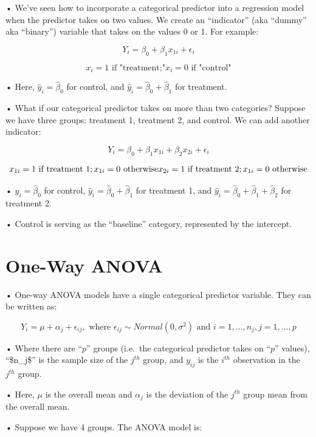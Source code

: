 \documentclass[
  letterpaper,
  DIV=11,
  numbers=noendperiod]{scrreprt}
\begin{document}
• We've seen how to incorporate a categorical predictor into a
regression model when the predictor takes on two values. We create an
``indicator'' (aka ``dummy'' aka ``binary'') variable that takes on the
values 0 or 1. For example:

\[
Y_i=\beta_0+\beta_1x_{1i} + \epsilon_i
\]

\[
x_i = 1 \text{ if "treatment;"} x_i = 0 \text{ if "control"}
\]

• Here, \(\hat{y}_i = \hat{\beta}_0\) for control, and
\(\hat{y}_i = \hat{\beta}_0 + \hat{\beta}_1\) for treatment.

• What if our categorical predictor takes on more than two categories?
Suppose we have three groups: treatment 1, treatment 2, and control. We
can add another indicator:

\[
Y_i=\beta_0+\beta_1x_{1i} + \beta_2x_{2i} + \epsilon_i
\]

\[
x_{1i} = 1 \text{ if treatment }1; x_{1i} = 0 \text{ otherwise} \\
x_{2i} = 1 \text{ if treatment }2; x_{1i} = 0 \text{ otherwise} 
\]

• \(\hat{y}_i = \hat{\beta}_0\) for control,
\(\hat{y}_i = \hat{\beta}_0 + \hat{\beta}_1\) for treatment 1, and
\(\hat{y}_i = \hat{\beta}_0 + \hat{\beta}_1 + \hat{\beta}_2\) for
treatment 2.

• Control is serving as the ``baseline'' category, represented by the
intercept.

\hypertarget{one-way-anova}{%
\section{One-Way ANOVA}\label{one-way-anova}}

• One-way ANOVA models have a single categorical predictor variable.
They can be written as:

\[
Y_i = \mu + \alpha_j + \epsilon_{ij}, \text{ where } \epsilon_{ij} \sim Normal(0,\sigma^2) \text{ and } i = 1, \dots ,n_j, j = 1, \dots, p
\]

• Where there are ``\(p\)'' groups (i.e.~the categorical predictor takes
on ``\(p\)'' values), ``\$n\_j\$'' is the sample size of the \(j^{th}\)
group, and \(y_{ij}\) is the \(i^{th}\) observation in the \(j^{th}\)
group.

• Here, \(\mu\) is the overall mean and \(\alpha_j\) is the deviation of
the \(j^{th}\) group mean from the overall mean.

• Suppose we have 4 groups. The ANOVA model is:
\end{document}
